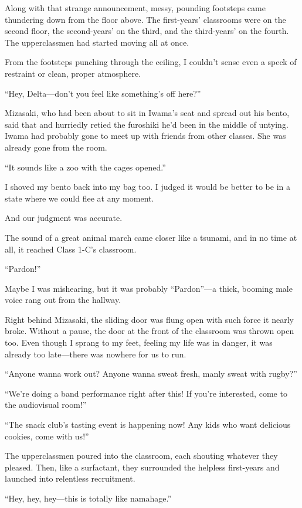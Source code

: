 \documentclass[
    a4paper,
    12pt,
    twoside,
    openany,
    UTF8,
    fontset=windows
]{ctexbook}
\begin{document}
Along with that strange announcement, messy, pounding footsteps came thundering down from the floor above. The first-years' classrooms were on the second floor, the second-years' on the third, and the third-years' on the fourth. The upperclassmen had started moving all at once.

From the footsteps punching through the ceiling, I couldn't sense even a speck of restraint or clean, proper atmosphere.

``Hey, Delta---don't you feel like something's off here?''

Mizasaki, who had been about to sit in Iwama's seat and spread out his bento, said that and hurriedly retied the furoshiki he'd been in the middle of untying. Iwama had probably gone to meet up with friends from other classes. She was already gone from the room.

``It sounds like a zoo with the cages opened.''

I shoved my bento back into my bag too. I judged it would be better to be in a state where we could flee at any moment.

And our judgment was accurate.

The sound of a great animal march came closer like a tsunami, and in no time at all, it reached Class 1-C's classroom.

``Pardon!''

Maybe I was mishearing, but it was probably ``Pardon''---a thick, booming male voice rang out from the hallway.

Right behind Mizasaki, the sliding door was flung open with such force it nearly broke. Without a pause, the door at the front of the classroom was thrown open too. Even though I sprang to my feet, feeling my life was in danger, it was already too late---there was nowhere for us to run.

``Anyone wanna work out? Anyone wanna sweat fresh, manly sweat with rugby?''

``We're doing a band performance right after this! If you're interested, come to the audiovisual room!''

``The snack club's tasting event is happening now! Any kids who want delicious cookies, come with us!''

The upperclassmen poured into the classroom, each shouting whatever they pleased. Then, like a surfactant, they surrounded the helpless first-years and launched into relentless recruitment.

``Hey, hey, hey---this is totally like namahage.''
\end{document}
